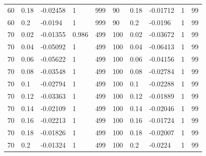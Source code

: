 \documentclass[12pt]{article}
\begin{document}
\begin{spacing}{2.0}
\begin{table}[hb!]
\begin{tabular}{l l | l l | l || ll | ll | l}
            60	&	0.18	&	-0.02458	&	1	&	999	&	90	&	0.18	&	-0.01712	&	1	&	99	\\
            60	&	0.2	&	-0.0194	&	1	&	999	&	90	&	0.2	&	-0.0196	&	1	&	99	\\
            70	&	0.02	&	-0.01355	&	0.986	&	499	&	100	&	0.02	&	-0.03672	&	1	&	99	\\
            70	&	0.04	&	-0.05092	&	1	&	499	&	100	&	0.04	&	-0.06413	&	1	&	99	\\
            70	&	0.06	&	-0.05622	&	1	&	499	&	100	&	0.06	&	-0.04156	&	1	&	99	\\
            70	&	0.08	&	-0.03548	&	1	&	499	&	100	&	0.08	&	-0.02784	&	1	&	99	\\
            70	&	0.1	&	-0.02794	&	1	&	499	&	100	&	0.1	&	-0.02288	&	1	&	99	\\
            70	&	0.12	&	-0.03363	&	1	&	499	&	100	&	0.12	&	-0.01889	&	1	&	99	\\
            70	&	0.14	&	-0.02109	&	1	&	499	&	100	&	0.14	&	-0.02046	&	1	&	99	\\
            70	&	0.16	&	-0.02213	&	1	&	499	&	100	&	0.16	&	-0.01724	&	1	&	99	\\
            70	&	0.18	&	-0.01826	&	1	&	499	&	100	&	0.18	&	-0.02007	&	1	&	99	\\
            70	&	0.2	&	-0.01324	&	1	&	499	&	100	&	0.2	&	-0.0224	&	1	&	99	\\			
			\end{tabular}
			\end{table}




\end{spacing}
\end{document}
